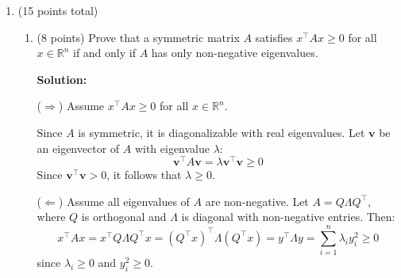 \documentclass[12pt]{article}
\newcommand{\qspace}{\vspace{1em}} %
\newenvironment{solution}{\noindent\textbf{Solution:} }{\qspace}
\begin{document}
\begin{enumerate}
\begin{enumerate}
        \item (4 points) Prove $\det(N + I) = 1$. (Hint: eigenvalues)
        
        \begin{solution}
        Since \( N \) is nilpotent, all its eigenvalues are \( 0 \). The eigenvalues of \( N + I \) are \( 0 + 1 = 1 \).

        The determinant of a matrix is the product of its eigenvalues. Therefore:
        \[
        \det(N + I) = \prod_{i=1}^n 1 = 1
        \]
        \end{solution}
        
        \item (4 points) Show that $ANA^{-1}$ is also nilpotent for the same $r$.
        
        \begin{solution}
        Given that \( N^r = 0 \), consider \( ANA^{-1} \):
        \[
        (ANA^{-1})^r = A N^r A^{-1} = A 0 A^{-1} = 0
        \]
        Therefore, \( ANA^{-1} \) is nilpotent with the same index \( r \).
        \end{solution}
    \end{enumerate}
    
    \item (15 points total)
    \begin{enumerate}
        \item (8 points) Prove that a symmetric matrix \( A \) satisfies \( x^\top A x \geq 0 \) for all \( x \in \mathbb{R}^n \) if and only if \( A \) has only non-negative eigenvalues.
    
        \begin{solution}
        
        (\(\Rightarrow\)) Assume \( x^\top A x \geq 0 \) for all \( x \in \mathbb{R}^n \).

        Since \( A \) is symmetric, it is diagonalizable with real eigenvalues. Let \( \mathbf{v} \) be an eigenvector of \( A \) with eigenvalue \( \lambda \):
        \[
        \mathbf{v}^\top A \mathbf{v} = \lambda \mathbf{v}^\top \mathbf{v} \geq 0
        \]
        Since \( \mathbf{v}^\top \mathbf{v} > 0 \), it follows that \( \lambda \geq 0 \).

        (\(\Leftarrow\)) Assume all eigenvalues of \( A \) are non-negative. Let \( A = Q \Lambda Q^\top \), where \( Q \) is orthogonal and \( \Lambda \) is diagonal with non-negative entries. Then:
        \[
        x^\top A x = x^\top Q \Lambda Q^\top x = (Q^\top x)^\top \Lambda (Q^\top x) = y^\top \Lambda y = \sum_{i=1}^n \lambda_i y_i^2 \geq 0
        \]
        since \( \lambda_i \geq 0 \) and \( y_i^2 \geq 0 \).
        \end{solution}
        

\end{enumerate}
\end{enumerate}
\end{document}
